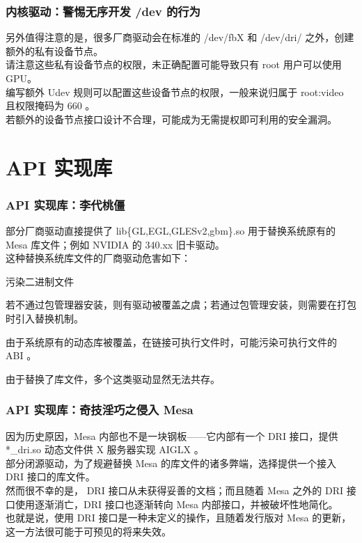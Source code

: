 \documentclass{ctexbeamer}
\begin{document}
\begin{frame}
    \frametitle{内核驱动：警惕无序开发 /dev 的行为}
    另外值得注意的是，很多厂商驱动会在标准的 /dev/fbX 和 /dev/dri/ 之外，创建额外的私有设备节点。\\
    请注意这些私有设备节点的权限，未正确配置可能导致只有 root 用户可以使用 GPU。\\
    编写额外 Udev 规则可以配置这些设备节点的权限，一般来说归属于 root:video 且权限掩码为 660 。\\
    若额外的设备节点接口设计不合理，可能成为无需提权即可利用的安全漏洞。\\
\end{frame}

\section{API 实现库}

\begin{frame}
    \frametitle{API 实现库：李代桃僵}
    部分厂商驱动直接提供了 lib\{GL,EGL,GLESv2,gbm\}.so 用于替换系统原有的 Mesa 库文件；例如 NVIDIA 的 340.xx 旧卡驱动。\\
    这种替换系统库文件的厂商驱动危害如下：\\
    \begin{labeling}{污染二进制文件}
        \item [污染包管理器] 若不通过包管理器安装，则有驱动被覆盖之虞；若通过包管理安装，则需要在打包时引入替换机制。
        \item [污染二进制文件] 由于系统原有的动态库被覆盖，在链接可执行文件时，可能污染可执行文件的 ABI 。
        \item [无法共存] 由于替换了库文件，多个这类驱动显然无法共存。
    \end{labeling}
\end{frame}

\begin{frame}
    \frametitle{API 实现库：奇技淫巧之侵入 Mesa}
    因为历史原因，Mesa 内部也不是一块钢板——它内部有一个 DRI 接口，提供 *\_dri.so 动态文件供 X 服务器实现 AIGLX 。\\
    部分闭源驱动，为了规避替换 Mesa 的库文件的诸多弊端，选择提供一个接入 DRI 接口的库文件。\\
    然而很不幸的是， DRI 接口从未获得妥善的文档；而且随着 Mesa 之外的 DRI 接口使用逐渐消亡，DRI 接口也逐渐转向 Mesa 内部接口，并被破坏性地简化。\\
    也就是说，使用 DRI 接口是一种未定义的操作，且随着发行版对 Mesa 的更新，这一方法很可能于可预见的将来失效。
\end{frame}
\end{document}
